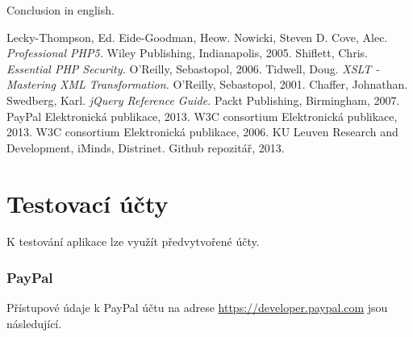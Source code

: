 \documentclass[12pt]{article}
\begin{document}
\begin{conclusions-en}
  Conclusion in english.
\end{conclusions-en}


\newpage
\begin{thebibliography}{99}

 Lecky-Thompson, Ed. Eide-Goodman, Heow. Nowicki, Steven D. Cove, Alec. \emph{Professional PHP5.}
                Wiley Publishing, Indianapolis, 2005.
 Shiflett, Chris. \emph{Essential PHP Security.}
                O'Reilly, Sebastopol, 2006.
 Tidwell, Doug. \emph{XSLT - Mastering XML Transformation.}
                O'Reilly, Sebastopol, 2001.
 Chaffer, Johnathan. Swedberg, Karl. \emph{jQuery Reference Guide.}
                Packt Publishing, Birmingham, 2007.
 PayPal
                Elektronická publikace, 2013.
 W3C consortium
                Elektronická publikace, 2013.
 W3C consortium
                Elektronická publikace, 2006.
 KU Leuven Research and Development, iMinds, Distrinet.
                Github repozitář, 2013.


\end{thebibliography}


\newpage
\appendix

\newpage
\section{Testovací účty}

K testování aplikace lze využít předvytvořené účty.

\subsubsection{PayPal}

Přístupové údaje k PayPal účtu na adrese \url{https://developer.paypal.com} jsou následující.
\end{document}
